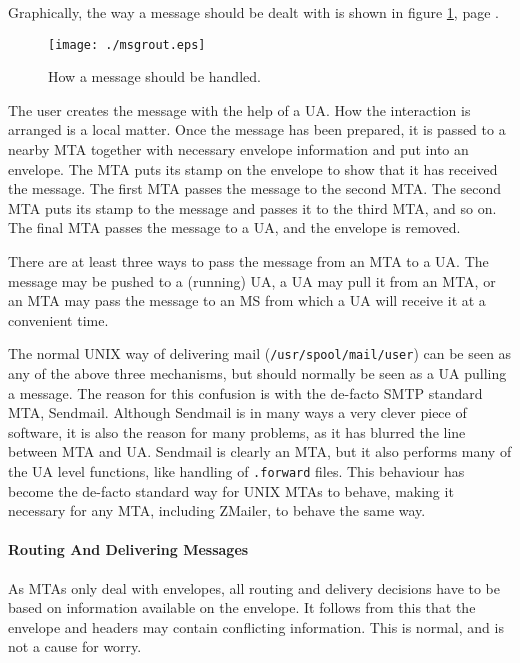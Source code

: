 Graphically, the way a message should be dealt with is shown 
in figure \ref{msgrout}, page \pageref{msgrout}.

\begin{figure}[tbp]
  \htmlimage{}
  \centering\texttt{[image: ./msgrout.eps]}
\caption{\label{msgrout}How a message should be handled. }
\end{figure}



The user creates the message with the help of a UA. How the interaction 
is arranged is a local matter. Once the message has been prepared, 
it is passed to a nearby MTA together with necessary envelope 
information and put into an envelope. The MTA puts its stamp on 
the envelope to show that it has received the message. The first 
MTA passes the message to the second MTA. The second MTA puts its 
stamp to the message and passes it to the third MTA, and so on. 
The final MTA passes the message to a UA, and the envelope is removed.

There are at least three ways to pass the message from an MTA to a UA. 
The message may be pushed to a (running) UA, a UA may pull it from an MTA, 
or an MTA may pass the message to an MS from which a UA will receive it at 
a convenient time.

The normal UNIX way of delivering mail ({\tt /usr/spool/mail/user}) can be 
seen as any of the above three mechanisms, but should normally be seen as a 
UA pulling a message. The reason for this confusion is with the de-facto SMTP 
standard MTA, Sendmail. Although Sendmail is in many ways a very clever 
piece of software, it is also the reason for many problems, as it has 
blurred the line between MTA and UA. Sendmail is clearly an MTA, but 
it also performs many of the UA level functions, like handling of 
{\tt .forward} files. This behaviour has become the de-facto standard 
way for UNIX MTAs to behave, making it necessary for any MTA, including ZMailer, 
to behave the same way.



\paragraph{Routing And Delivering Messages}



As MTAs only deal with envelopes, all routing and delivery decisions have to be 
based on information available on the envelope. It follows from this that 
the envelope and headers may contain conflicting information. This is normal, 
and is not a cause for worry.

